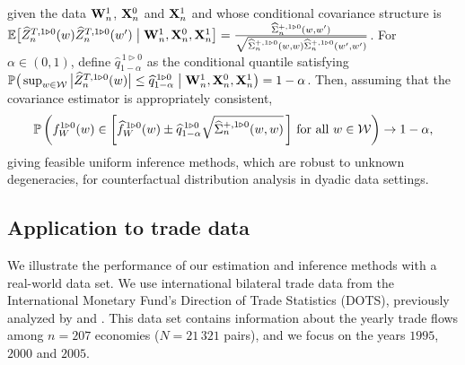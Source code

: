 given the data $\mathbf{W}_n^1$, $\mathbf{X}_n^0$ and $\mathbf{X}_n^1$
and whose conditional covariance structure is
$\mathbb{E}\big[\widehat Z_n^{T, 1 \triangleright 0}(w)
\widehat Z_n^{T, 1 \triangleright 0}(w')
\bigm| \mathbf{W}_n^1, \mathbf{X}_n^0, \mathbf{X}_n^1 \big]
= \frac{\widehat \Sigma_n^{+, 1 \triangleright 0}(w,w')}
{\sqrt{\widehat \Sigma_n^{+, 1 \triangleright 0}(w,w)
    \widehat \Sigma_n^{+, 1 \triangleright 0}(w',w')}}$.
For $\alpha \in (0,1)$, define
$\widehat q_{1-\alpha}^{\,1 \triangleright 0}$
as the conditional quantile satisfying
$\mathbb{P}\big(\sup_{w \in \mathcal{W}}\big| \widehat Z_n^{T, 1 \triangleright 0}(w) \big|
\leq \widehat q_{1-\alpha}^{\,1 \triangleright 0}
\bigm\vert \mathbf{W}_n^1, \mathbf{X}_n^0, \mathbf{X}_n^1 \big)
= 1 - \alpha$.
Then, assuming that the covariance estimator is appropriately consistent,
%
\begin{align*}
  \mathbb{P}\left(
    f_W^{1 \triangleright 0}(w)
    \in
    \left[
      \widehat f_W^{\,1 \triangleright 0}(w)
      \pm
      \widehat q^{\,1 \triangleright 0}_{1-\alpha}
      \sqrt{\widehat\Sigma_n^{+, 1 \triangleright 0}(w,w)}
      \,\right]
    \,\textup{for all }
    w \in \mathcal{W}
  \right)
  \to 1 - \alpha,
\end{align*}
%
giving feasible uniform inference methods,
which are robust to unknown degeneracies,
for counterfactual distribution analysis in dyadic data settings.

\subsection{Application to trade data}
\label{sec:trade_data}

We illustrate the performance of our
estimation and inference methods with a real-world data set.
We use international bilateral trade data
from the International Monetary Fund's
Direction of Trade Statistics (DOTS),
previously analyzed by \citet{head2014gravity}
and \citet{chiang2022inference}.
This data set contains information about
the yearly trade flows among
$n = 207$ economies ($N = 21\,321$ pairs),
and we focus on the years
$1995$, $2000$ and $2005$.

